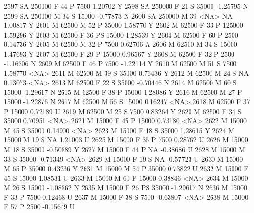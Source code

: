 \documentclass{article}
\begin{document}
\begin{Schunk}
\begin{Soutput}
2597     SA     250000   F  44         P   7500   1.20702    Y
2598     SA     250000   F  21         S  35000  -1.25795    N
2599     SA     250000   M  34         S  15000  -0.77873    N
2600     SA     250000   M  39      <NA>     NA   1.00817    Y
2601      M      62500   M  52         P  35000   1.58770    Y
2602      M      62500   F  33         P 125000   1.59296    Y
2603      M      62500   F  36        PS  15000   1.28539    Y
2604      M      62500   F  60         P   2500   0.14736    Y
2605      M      62500   M  32         P   7500   0.62706    A
2606      M      62500   M  34         S  15000   1.47693    Y
2607      M      62500   F  29         P  15000   0.96567    Y
2608      M      62500   F  32         P   2500  -1.16306    N
2609      M      62500   F  46         P   7500  -1.22114    Y
2610      M      62500   M  51         S   7500   1.58770 <NA>
2611      M      62500   M  39         S  35000   0.76436    Y
2612      M      62500   M  24         S     NA   0.13073 <NA>
2613      M      62500   F  22         S  35000  -0.70446    N
2614      M      62500   M  60         S  15000  -1.29617    N
2615      M      62500   F  38         P  15000   1.28086    Y
2616      M      62500   M  27         P  15000  -1.22876    N
2617      M      62500   M  56         S  15000   0.16247 <NA>
2618      M      62500   F  37         P  15000   0.72189    U
2619      M      62500   M  25         S   7500   0.83264    Y
2620      M      62500   F  34         S  35000   0.70951 <NA>
2621      M      15000   F  45         P  15000   0.73180 <NA>
2622      M      15000   M  45         S  35000   0.14900 <NA>
2623      M      15000   F  18         S  35000   1.28615    Y
2624      M      15000   M  19         S     NA   1.21003    U
2625      M      15000   F  35         P   7500   0.28762    U
2626      M      15000   M  18         S  35000  -0.50889    Y
2627      M      15000   F  44         P     NA  -0.38686    U
2628      M      15000   M  33         S  35000  -0.71349 <NA>
2629      M      15000   F  19         S     NA  -0.57723    U
2630      M      15000   M  65         P  35000   0.43236    Y
2631      M      15000   M  54         P  35000   0.73822    U
2632      M      15000   F  45         S  15000   1.08531    U
2633      M      15000   M  60         P  15000   0.38846 <NA>
2634      M      15000   M  26         S  15000  -1.08862    N
2635      M      15000   F  26        PS  35000  -1.29617    N
2636      M      15000   F  33         P   7500   0.12468    U
2637      M      15000   F  38         S   7500  -0.63807 <NA>
2638      M      15000   F  57         P   2500  -0.15649    U

\end{Soutput}
\end{Schunk}
\end{document}
